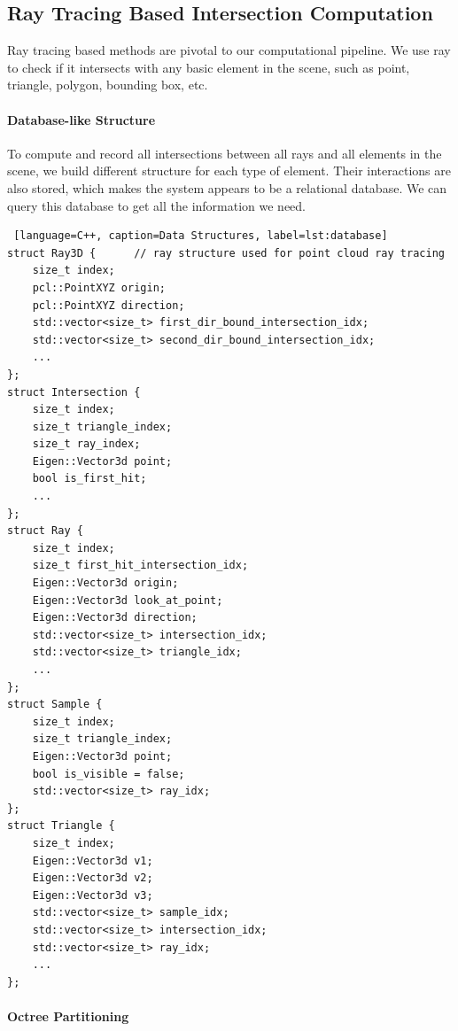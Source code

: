 \documentclass[11pt, a4paper,oneside,chapterprefix=false]{scrbook}
\begin{document}
\subsection{Ray Tracing Based Intersection Computation} \label{sec:ray tracing}

Ray tracing based methods are pivotal to our computational pipeline. We use ray to check if it intersects with any basic element in the scene, such as point, triangle, polygon, bounding box, etc.

\paragraph{Database-like Structure}

To compute and record all intersections between all rays and all elements in the scene, we build different structure for each type of element. Their interactions are also stored, which makes the system appears to be a relational database. We can query this database to get all the information we need.  

\begin{lstlisting} [language=C++, caption=Data Structures, label=lst:database]
struct Ray3D {      // ray structure used for point cloud ray tracing
    size_t index;
    pcl::PointXYZ origin;
    pcl::PointXYZ direction;
    std::vector<size_t> first_dir_bound_intersection_idx;
    std::vector<size_t> second_dir_bound_intersection_idx;
    ...
};
struct Intersection {
    size_t index;
    size_t triangle_index;
    size_t ray_index;
    Eigen::Vector3d point;
    bool is_first_hit;
    ...
};
struct Ray { 
    size_t index;
    size_t first_hit_intersection_idx;
    Eigen::Vector3d origin;
    Eigen::Vector3d look_at_point;
    Eigen::Vector3d direction;
    std::vector<size_t> intersection_idx;
    std::vector<size_t> triangle_idx;
    ...
};
struct Sample {
    size_t index;
    size_t triangle_index;
    Eigen::Vector3d point;
    bool is_visible = false;
    std::vector<size_t> ray_idx;
};
struct Triangle {
    size_t index;
    Eigen::Vector3d v1;
    Eigen::Vector3d v2;
    Eigen::Vector3d v3;
    std::vector<size_t> sample_idx;
    std::vector<size_t> intersection_idx;
    std::vector<size_t> ray_idx;
    ...
};

\end{lstlisting}

\paragraph{Octree Partitioning}
\end{document}
